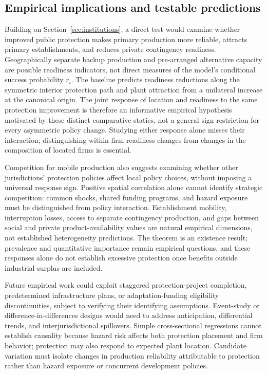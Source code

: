 \subsection{Empirical implications and testable predictions}\label{sec:empirical-implications}

Building on Section~\ref{sec:institutions}, a direct test would examine whether improved public protection makes primary production more reliable, attracts primary establishments, and reduces private contingency readiness. Geographically separate backup production and pre-arranged alternative capacity are possible readiness indicators, not direct measures of the model's conditional success probability $r_i$. The baseline predicts readiness reductions along the symmetric interior protection path and plant attraction from a unilateral increase at the canonical origin. The joint response of location and readiness to the same protection improvement is therefore an informative empirical hypothesis motivated by these distinct comparative statics, not a general sign restriction for every asymmetric policy change. Studying either response alone misses their interaction; distinguishing within-firm readiness changes from changes in the composition of located firms is essential.

Competition for mobile production also suggests examining whether other jurisdictions' protection policies affect local policy choices, without imposing a universal response sign. Positive spatial correlation alone cannot identify strategic competition: common shocks, shared funding programs, and hazard exposure must be distinguished from policy interaction. Establishment mobility, interruption losses, access to separate contingency production, and gaps between social and private product-availability values are natural empirical dimensions, not established heterogeneity predictions. The theorem is an existence result; prevalence and quantitative importance remain empirical questions, and these responses alone do not establish excessive protection once benefits outside industrial surplus are included.

Future empirical work could exploit staggered protection-project completion, predetermined infrastructure plans, or adaptation-funding eligibility discontinuities, subject to verifying their identifying assumptions. Event-study or difference-in-differences designs would need to address anticipation, differential trends, and interjurisdictional spillovers. Simple cross-sectional regressions cannot establish causality because hazard risk affects both protection placement and firm behavior; protection may also respond to expected plant location. Candidate variation must isolate changes in production reliability attributable to protection rather than hazard exposure or concurrent development policies.

